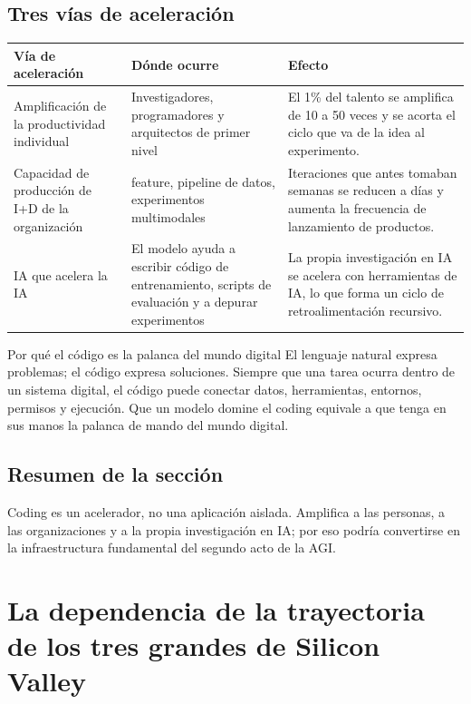 \documentclass[a4paper]{article}
\begin{document}
\subsection{Tres vías de aceleración}

\noindent\begin{tabularx}{\textwidth}{p{}p{}X}
\toprule
Vía de aceleración & Dónde ocurre & Efecto \\
\midrule
Amplificación de la productividad individual & Investigadores, programadores y arquitectos de primer nivel & El 1\% del talento se amplifica de 10 a 50 veces y se acorta el ciclo que va de la idea al experimento. \\
Capacidad de producción de I+D de la organización & feature, pipeline de datos, experimentos multimodales & Iteraciones que antes tomaban semanas se reducen a días y aumenta la frecuencia de lanzamiento de productos. \\
IA que acelera la IA & El modelo ayuda a escribir código de entrenamiento, scripts de evaluación y a depurar experimentos & La propia investigación en IA se acelera con herramientas de IA, lo que forma un ciclo de retroalimentación recursivo. \\
\bottomrule
\end{tabularx}

\begin{knowledgebox}{Por qué el código es la palanca del mundo digital}
El lenguaje natural expresa problemas; el código expresa soluciones. Siempre que una tarea ocurra dentro de un sistema digital, el código puede conectar datos, herramientas, entornos, permisos y ejecución. Que un modelo domine el coding equivale a que tenga en sus manos la palanca de mando del mundo digital.
\end{knowledgebox}

\subsection{Resumen de la sección}

Coding es un acelerador, no una aplicación aislada. Amplifica a las personas, a las organizaciones y a la propia investigación en IA; por eso podría convertirse en la infraestructura fundamental del segundo acto de la AGI.

\section{La dependencia de la trayectoria de los tres grandes de Silicon Valley}
\end{document}
